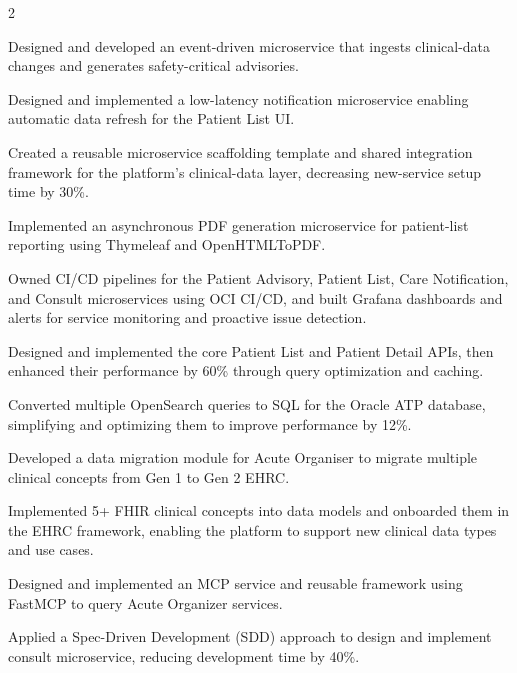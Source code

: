 \documentclass[]{hieudo-build}
\begin{document}
\begin{paracol}{2}
\begin{tightemize}
 \item Designed and developed an event-driven microservice that ingests clinical-data changes and generates safety-critical advisories.
 \item Designed and implemented a low-latency notification microservice enabling automatic data refresh for the Patient List UI.
 \item Created a reusable microservice scaffolding template and shared integration framework for the platform's clinical-data layer, decreasing new-service setup time by 30\%.
 \item Implemented an asynchronous PDF generation microservice for patient-list reporting using Thymeleaf and OpenHTMLToPDF.
 \item Owned CI/CD pipelines for the Patient Advisory, Patient List, Care Notification, and Consult microservices using OCI CI/CD, and built Grafana dashboards and alerts for service monitoring and proactive issue detection.
 \item Designed and implemented the core Patient List and Patient Detail APIs, then enhanced their performance by 60\% through query optimization and caching.
 \item Converted multiple OpenSearch queries to SQL for the Oracle ATP database, simplifying and optimizing them to improve performance by 12\%.
 \item Developed a data migration module for Acute Organiser to migrate multiple clinical concepts from Gen 1 to Gen 2 EHRC.
 \item Implemented 5+ FHIR clinical concepts into data models and onboarded them in the EHRC framework, enabling the platform to support new clinical data types and use cases.
 \item Designed and implemented an MCP service and reusable framework using FastMCP to query Acute Organizer services.
 \item Applied a Spec-Driven Development (SDD) approach to design and implement consult microservice, reducing development time by 40\%.
\end{tightemize}
\sectionsep



\end{paracol}
\end{document}
